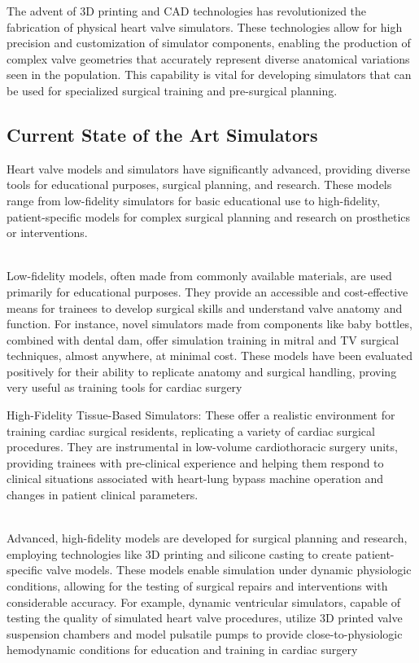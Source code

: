 The advent of 3D printing and \gls{CAD} technologies has revolutionized the fabrication of physical heart valve simulators. These technologies allow for high precision and customization of simulator components, enabling the production of complex valve geometries that accurately represent diverse anatomical variations seen in the population. This capability is vital for developing simulators that can be used for specialized surgical training and pre-surgical planning.

\subsection{Current State of the Art Simulators}

Heart valve models and simulators have significantly advanced, providing diverse tools for educational purposes, surgical planning, and research. These models range from low-fidelity simulators for basic educational use to high-fidelity, patient-specific models for complex surgical planning and research on prosthetics or interventions.

\\
Low-fidelity models, often made from commonly available materials, are used primarily for educational purposes. They provide an accessible and cost-effective means for trainees to develop surgical skills and understand valve anatomy and function. For instance, novel simulators made from components like baby bottles, combined with dental dam, offer simulation training in mitral and \gls{TV} surgical techniques, almost anywhere, at minimal cost. These models have been evaluated positively for their ability to replicate anatomy and surgical handling, proving very useful as training tools for cardiac surgery ~

High-Fidelity Tissue-Based Simulators: These offer a realistic environment for training cardiac surgical residents, replicating a variety of cardiac surgical procedures. They are instrumental in low-volume cardiothoracic surgery units, providing trainees with pre-clinical experience and helping them respond to clinical situations associated with heart-lung bypass machine operation and changes in patient clinical parameters. ~

\\
Advanced, high-fidelity models are developed for surgical planning and research, employing technologies like 3D printing and silicone casting to create patient-specific valve models. These models enable simulation under dynamic physiologic conditions, allowing for the testing of surgical repairs and interventions with considerable accuracy. For example, dynamic ventricular simulators, capable of testing the quality of simulated heart valve procedures, utilize 3D printed valve suspension chambers and model pulsatile pumps to provide close-to-physiologic hemodynamic conditions for education and training in cardiac surgery ~

